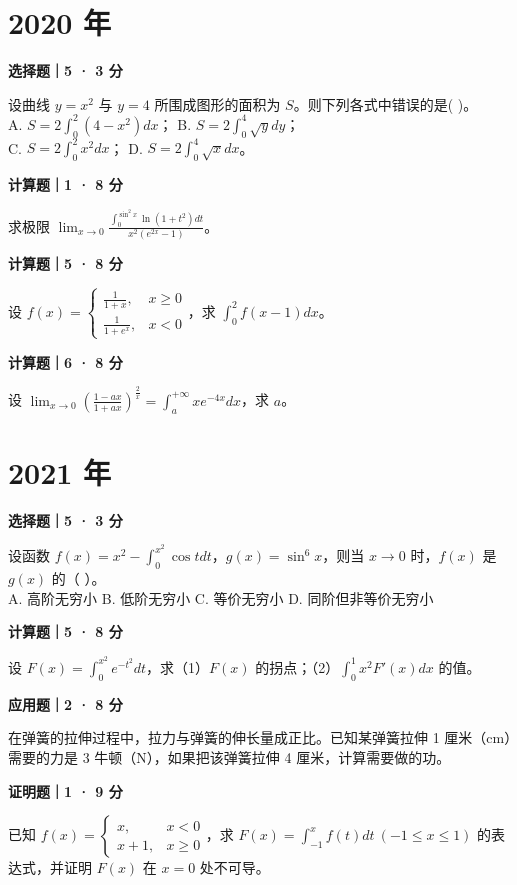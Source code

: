 

\section*{2020 年}


\textbf{选择题｜5 · 3 分}

设曲线 $y = x^2$ 与 $y = 4$ 所围成图形的面积为 $S$。则下列各式中错误的是( \quad )。\\
A. $S = 2 \int_0^2 (4 - x^2) dx$； \quad B. $S = 2 \int_0^4 \sqrt{y} dy$；\\
C. $S = 2 \int_0^2 x^2 dx$； \quad D. $S = 2 \int_0^4 \sqrt{x} dx$。


\textbf{计算题｜1 · 8 分}

求极限 $\lim_{x\to0} \frac{\int_0^{\sin^2 x} \ln(1+t^2) dt}{x^2(e^{2x}-1)}$。


\textbf{计算题｜5 · 8 分}

设 $f(x) = \begin{cases} \frac{1}{1+x}, & x \ge 0 \\ \frac{1}{1+e^x}, & x < 0 \end{cases}$，求 $\int_0^2 f(x - 1) dx$。


\textbf{计算题｜6 · 8 分}

设 $\lim_{x\to 0} \left( \frac{1-ax}{1+ax} \right)^{\frac{2}{x}} = \int_a^{+\infty} xe^{-4x} dx$，求 $a$。


\section*{2021 年}


\textbf{选择题｜5 · 3 分}

设函数 $f(x) = x^2 - \int_0^{x^2} \cos t dt$，$g(x) = \sin^6 x$，则当 $x \to 0$ 时，$f(x)$ 是 $g(x)$ 的（ \quad ）。\\
A. 高阶无穷小 \quad B. 低阶无穷小 \quad C. 等价无穷小 \quad D. 同阶但非等价无穷小


\textbf{计算题｜5 · 8 分}

设 $F(x) = \int_0^{x^2} e^{-t^2} dt$，求（1）$F(x)$ 的拐点；（2）$\int_0^1 x^2 F'(x) dx$ 的值。


\textbf{应用题｜2 · 8 分}

在弹簧的拉伸过程中，拉力与弹簧的伸长量成正比。已知某弹簧拉伸 1 厘米（cm）需要的力是 3 牛顿（N），如果把该弹簧拉伸 4 厘米，计算需要做的功。


\textbf{证明题｜1 · 9 分}

已知 $f(x) = \begin{cases} x, & x < 0 \\ x+1, & x \ge 0 \end{cases}$，求 $F(x) = \int_{-1}^x f(t) dt \ (-1 \le x \le 1)$ 的表达式，并证明 $F(x)$ 在 $x = 0$ 处不可导。


